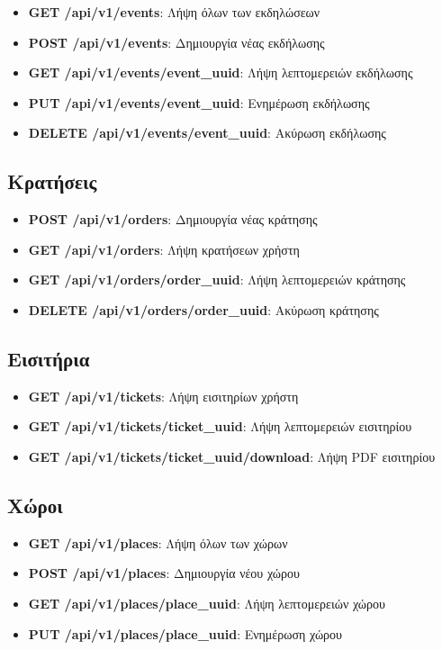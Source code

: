 \documentclass[12pt,a4paper]{report}
\begin{document}
\begin{itemize}
    \item \textbf{GET /api/v1/events}: Λήψη όλων των εκδηλώσεων
    \item \textbf{POST /api/v1/events}: Δημιουργία νέας εκδήλωσης
    \item \textbf{GET /api/v1/events/{event\_uuid}}: Λήψη λεπτομερειών εκδήλωσης
    \item \textbf{PUT /api/v1/events/{event\_uuid}}: Ενημέρωση εκδήλωσης
    \item \textbf{DELETE /api/v1/events/{event\_uuid}}: Ακύρωση εκδήλωσης
\end{itemize}

\subsection{Κρατήσεις}

\begin{itemize}
    \item \textbf{POST /api/v1/orders}: Δημιουργία νέας κράτησης
    \item \textbf{GET /api/v1/orders}: Λήψη κρατήσεων χρήστη
    \item \textbf{GET /api/v1/orders/{order\_uuid}}: Λήψη λεπτομερειών κράτησης
    \item \textbf{DELETE /api/v1/orders/{order\_uuid}}: Ακύρωση κράτησης
\end{itemize}

\subsection{Εισιτήρια}

\begin{itemize}
    \item \textbf{GET /api/v1/tickets}: Λήψη εισιτηρίων χρήστη
    \item \textbf{GET /api/v1/tickets/{ticket\_uuid}}: Λήψη λεπτομερειών εισιτηρίου
    \item \textbf{GET /api/v1/tickets/{ticket\_uuid}/download}: Λήψη PDF εισιτηρίου
\end{itemize}

\subsection{Χώροι}

\begin{itemize}
    \item \textbf{GET /api/v1/places}: Λήψη όλων των χώρων
    \item \textbf{POST /api/v1/places}: Δημιουργία νέου χώρου
    \item \textbf{GET /api/v1/places/{place\_uuid}}: Λήψη λεπτομερειών χώρου
    \item \textbf{PUT /api/v1/places/{place\_uuid}}: Ενημέρωση χώρου
\end{itemize}
\end{document}
